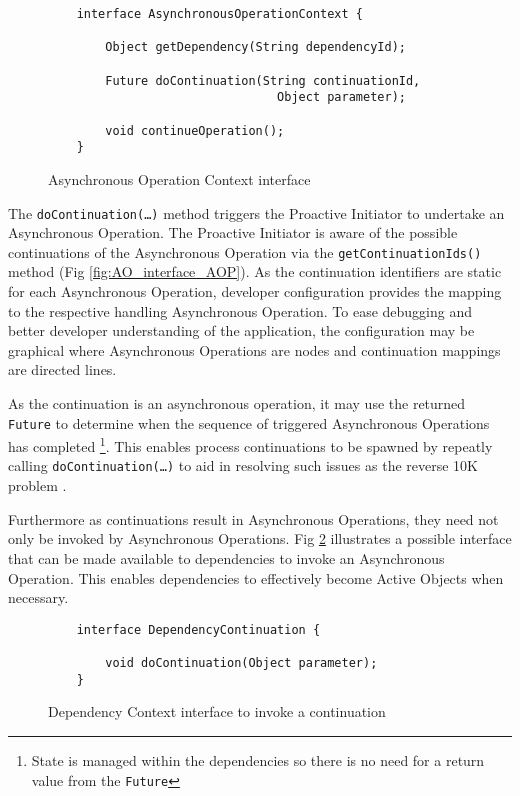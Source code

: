 \documentclass{article}
\begin{document}
\begin{figure}[!h]
\begin{verbatim}
    interface AsynchronousOperationContext {
    
        Object getDependency(String dependencyId);
        
        Future doContinuation(String continuationId, 
                                Object parameter);
        
        void continueOperation();
    }
\end{verbatim}
\caption[Caption for Code]{Asynchronous Operation Context interface \footnotemark}
\label{fig:AOC_interface}
\end{figure}

The \texttt{doContinuation(\ldots)} method triggers the Proactive Initiator to
undertake an Asynchronous Operation.  The Proactive Initiator is aware of the
possible continuations of the Asynchronous Operation via the
\texttt{getContinuationIds()} method (Fig \ref{fig:AO_interface_AOP}).  As the
continuation identifiers are static for each Asynchronous Operation, developer
configuration provides the mapping to the respective handling Asynchronous
Operation.  To ease debugging and better developer understanding of the
application, the configuration may be graphical where Asynchronous Operations
are nodes and continuation mappings are directed lines.

As the continuation is an asynchronous operation, it may use the returned
\texttt{Future} to determine when the sequence of triggered Asynchronous
Operations has completed \footnote{State is managed within the dependencies so
there is no need for a return value from the \texttt{Future}}.  This enables
process continuations \cite{process-continuation} to be spawned by repeatly
calling \texttt{doContinuation(\ldots)} to aid in resolving such issues as the
reverse 10K problem \cite{reverse-ten-k-problem}.

Furthermore as continuations result in Asynchronous Operations, they need not
only be invoked by Asynchronous Operations. Fig \ref{fig:DC_interface}
illustrates a possible interface that can be made available to dependencies to
invoke an Asynchronous Operation.  This enables dependencies to effectively
become Active Objects \cite{active-object} when necessary.

\begin{figure}[!h]
\begin{verbatim}
    interface DependencyContinuation {
            
        void doContinuation(Object parameter);
    }
\end{verbatim}
\caption[Caption for Code]{Dependency Context interface to invoke a continuation}
\label{fig:DC_interface}
\end{figure}
\end{document}
